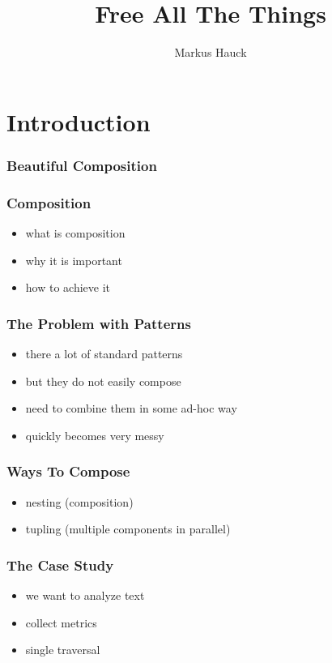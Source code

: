 \documentclass{beamer}
\title{Free All The Things}
\author{Markus Hauck}
\begin{document}
\begin{frame}
  \titlepage{}
\end{frame}

\section{Introduction}\label{sec:introduction}

\begin{frame}
\frametitle{Beautiful Composition}
\begin{itemize}
\end{itemize}
\end{frame}

\begin{frame}
  \frametitle{Composition}
  \begin{itemize}
  \item what is composition
  \item why it is important
  \item how to achieve it
  \end{itemize}
\end{frame}

\begin{frame}
  \frametitle{The Problem with Patterns}
  \begin{itemize}
  \item there a lot of standard patterns
  \item but they do not easily compose
  \item need to combine them in some ad-hoc way
  \item quickly becomes very messy
  \end{itemize}
\end{frame}

\begin{frame}
  \frametitle{Ways To Compose}
  \begin{itemize}
  \item nesting (composition)
  \item tupling (multiple components in parallel)
  \end{itemize}
\end{frame}

\begin{frame}
  \frametitle{The Case Study}
  \begin{itemize}
  \item we want to analyze text
  \item collect metrics
  \item single traversal
  \end{itemize}
\end{frame}
\end{document}
